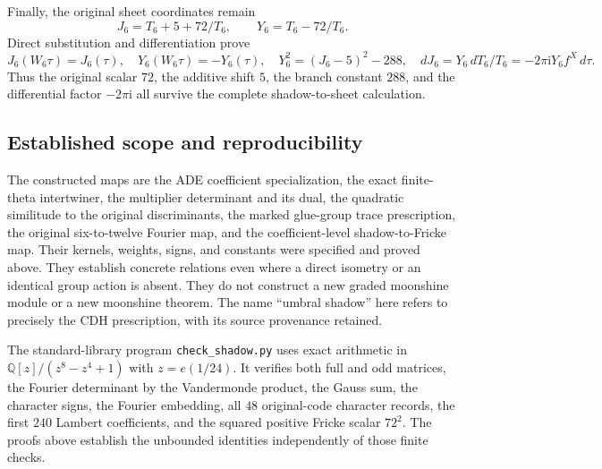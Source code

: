 Finally, the original sheet coordinates remain
\[
 J_6=T_6+5+72/T_6,\qquad Y_6=T_6-72/T_6.
\]
Direct substitution and differentiation prove
\[
 J_6(W_6\tau)=J_6(\tau),\quad
 Y_6(W_6\tau)=-Y_6(\tau),\quad
 Y_6^2=(J_6-5)^2-288,\quad
 dJ_6=Y_6\,dT_6/T_6=-2\pi\mathrm iY_6 f^X\,d\tau.
\]
Thus the original scalar $72$, the additive shift $5$, the branch
constant $288$, and the differential factor $-2\pi\mathrm i$ all
survive the complete shadow-to-sheet calculation.

\subsection{Established scope and reproducibility}

The constructed maps are the ADE coefficient specialization, the exact
finite-theta intertwiner, the multiplier determinant and its dual, the
quadratic similitude to the original discriminants, the marked glue-group
trace prescription, the original six-to-twelve Fourier map, and the
coefficient-level shadow-to-Fricke map.  Their kernels, weights, signs,
and constants were specified and proved above.  They establish concrete
relations even where a direct isometry or an identical group action is
absent.  They do not construct a new graded moonshine module or a new
moonshine theorem.  The name ``umbral shadow'' here refers to precisely
the CDH prescription, with its source provenance retained.

The standard-library program \texttt{check\_shadow.py} uses exact
arithmetic in $\mathbb Q[z]/(z^8-z^4+1)$ with $z=e(1/24)$.
It verifies both full and odd matrices, the Fourier determinant by the
Vandermonde product, the Gauss sum, the character signs, the Fourier
embedding, all $48$ original-code character records, the first $240$
Lambert coefficients, and the squared positive Fricke scalar $72^2$.
The proofs above establish the unbounded identities independently of
those finite checks.
